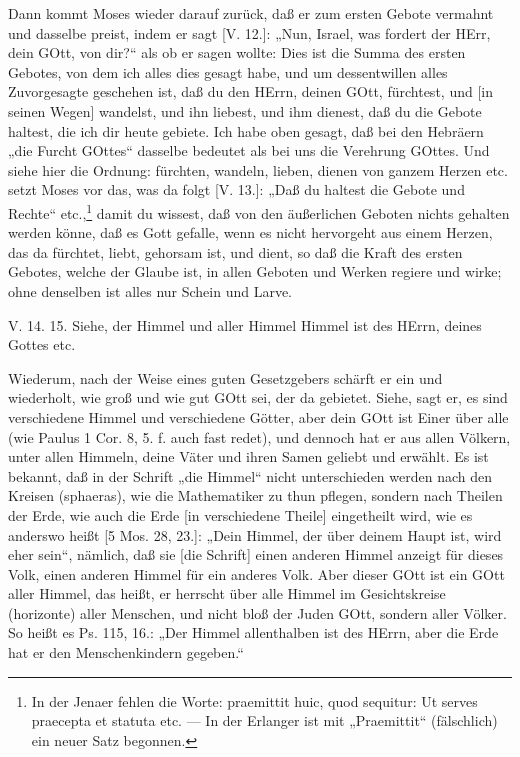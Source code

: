 Dann kommt Moses wieder darauf zurück, daß er zum ersten Gebote vermahnt und dasselbe preist, indem er sagt [V. 12.]: „Nun, Israel, was fordert der HErr, dein GOtt, von dir?“ als ob er sagen wollte: Dies ist die Summa des ersten Gebotes, von dem ich alles dies gesagt habe, und um dessentwillen alles Zuvorgesagte geschehen ist, daß du den HErrn, deinen GOtt, fürchtest, und [in seinen Wegen] wandelst, und ihn liebest, und ihm dienest, daß du die Gebote haltest, die ich dir heute gebiete. Ich habe oben gesagt, daß bei den Hebräern „die Furcht GOttes“ dasselbe bedeutet als bei uns die Verehrung GOttes. Und siehe hier die Ordnung: fürchten, wandeln, lieben, dienen von ganzem Herzen etc. setzt Moses vor das, was da folgt [V. 13.]: „Daß du haltest die Gebote und Rechte“ etc.,\footnote{In der Jenaer fehlen die Worte: praemittit huic, quod sequitur: Ut serves praecepta et statuta etc. — In der Erlanger ist mit „Praemittit“ (fälschlich) ein neuer Satz begonnen.} damit du wissest, daß von den äußerlichen Geboten nichts gehalten werden könne, daß es Gott gefalle, wenn es nicht hervorgeht aus einem Herzen, das da fürchtet, liebt, gehorsam ist, und dient, so daß die Kraft des ersten Gebotes, welche der Glaube ist, in allen Geboten und Werken regiere und wirke; ohne denselben ist alles nur Schein und Larve.

\begin{schriftzitat}
V. 14. 15. Siehe, der Himmel und aller Himmel Himmel ist des HErrn, deines Gottes etc.
\end{schriftzitat}

Wiederum, nach der Weise eines guten Gesetzgebers schärft er ein und wiederholt, wie groß und wie gut GOtt sei, der da gebietet. Siehe, sagt er, es sind verschiedene Himmel und verschiedene Götter, aber dein GOtt ist Einer über alle (wie Paulus 1 Cor. 8, 5. f. auch fast redet), und dennoch hat er aus allen Völkern, unter allen Himmeln, deine Väter und ihren Samen geliebt und erwählt. Es ist bekannt, daß in der Schrift „die Himmel“ nicht unterschieden werden nach den Kreisen (sphaeras), wie die Mathematiker zu thun pflegen, sondern nach Theilen der Erde, wie auch die Erde [in verschiedene Theile] eingetheilt wird, wie es anderswo heißt [5 Mos. 28, 23.]: „Dein Himmel, der über deinem Haupt ist, wird eher sein“, nämlich, daß sie [die Schrift] einen anderen Himmel anzeigt für dieses Volk, einen anderen Himmel für ein anderes Volk. Aber dieser GOtt ist ein GOtt aller Himmel, das heißt, er herrscht
über alle Himmel im Gesichtskreise (horizonte) aller Menschen, und nicht bloß der Juden GOtt, sondern aller Völker. So heißt es Ps. 115, 16.: „Der Himmel allenthalben ist des HErrn, aber die Erde hat er den Menschenkindern gegeben.“

